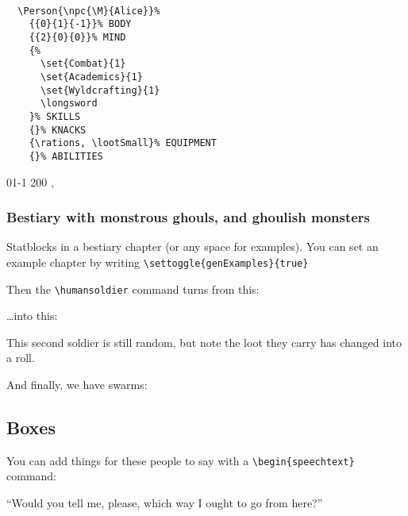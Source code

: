 \documentclass[a4paper,openany]{book}
\begin{document}
\begin{multicols}{2}
\begin{verbatim}

  \Person{\npc{\M}{Alice}}%
    {{0}{1}{-1}}% BODY
    {{2}{0}{0}}% MIND
    {%
      \set{Combat}{1}
      \set{Academics}{1}
      \set{Wyldcrafting}{1}
      \longsword
    }% SKILLS
    {}% KNACKS
    {\rations, \lootSmall}% EQUIPMENT
    {}% ABILITIES

\end{verbatim}


%
  {{0}{1}{-1}}%
  {{2}{0}{0}}%
  {%
    \longsword
    \completeleather
  }%
  {}%
  {\rations, \lootSmall}%
  {}%

\showNumbers

\subsubsection{Bestiary with monstrous ghouls, and ghoulish monsters}

Statblocks in a bestiary chapter (or any space for examples).
You can set an example chapter by writing \verb"\settoggle{genExamples}{true}"

Then the \verb"\humansoldier" command turns from this:

\humansoldier

\showNumbers

\ldots into this:


\humansoldier

\showNumbers

This second soldier is still random, but note the loot they carry has changed into a roll.

And finally, we have swarms:


\subsection{Boxes}

You can add things for these people to say with a \verb"\begin{speechtext}" command:

\begin{speechtext}

  ``Would you tell me, please, which way I ought to go from here?''


\end{speechtext}
\end{multicols}
\end{document}
